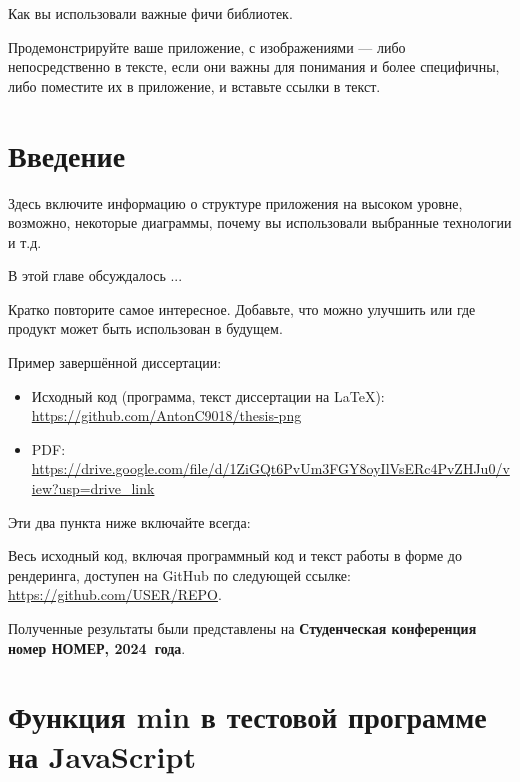\documentclass[a4paper,12pt]{report}
\newcommand{\conferencesList}{Студенческая конференция номер НОМЕР, \year~года}
\renewcommand{\year}{2024}
\newcommand{\github}{\url{https://github.com/USER/REPO}}
\begin{document}
Как вы использовали важные фичи библиотек.

Продемонстрируйте ваше приложение, с изображениями — либо непосредственно в тексте,
если они важны для понимания и более специфичны,
либо поместите их в приложение, и вставьте ссылки в текст.

\section{Введение}

Здесь включите информацию о структуре приложения на высоком уровне,
возможно, некоторые диаграммы, почему вы использовали выбранные технологии и т.д.


В этой главе обсуждалось ...


Кратко повторите самое интересное.
Добавьте, что можно улучшить или где продукт может быть использован в будущем.

Пример завершённой диссертации:
\begin{itemize}
  \item Исходный код (программа, текст диссертации на \LaTeX{}): \url{https://github.com/AntonC9018/thesis-png}
  \item PDF: \url{https://drive.google.com/file/d/1ZiGQt6PvUm3FGY8oyIlVsERc4PvZHJu0/view?usp=drive_link}
\end{itemize}

Эти два пункта ниже включайте всегда:

Весь исходный код, включая программный код и текст работы
в форме до рендеринга, доступен на GitHub по следующей ссылке: \github.

Полученные результаты были представлены на \textbf{\conferencesList}\cite{self}.

\bibliographyChapter

\appendixChapter

\section{Функция min в тестовой программе на JavaScript}\label{appendix:example_min}
\inputminted{js}{../src/appendix_example.js}

\declarationPage{}
\end{document}
